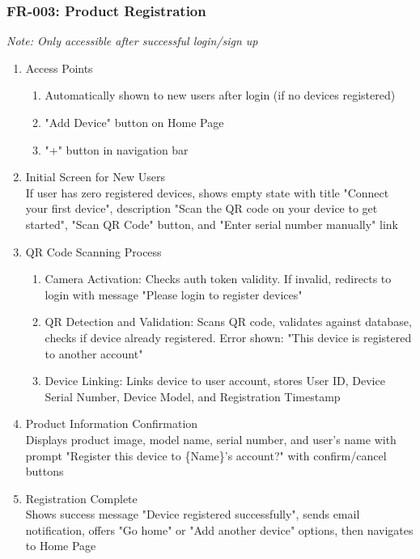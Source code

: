 \documentclass[conference]{IEEEtran}
\begin{document}
        \subsubsection{FR-003: Product Registration}
            \textit{Note: Only accessible after successful login/sign up}
            \begin{enumerate}
                \item Access Points
                    \begin{enumerate}
                        \item Automatically shown to new users after login (if no devices registered)
                        \item "Add Device" button on Home Page
                        \item "+" button in navigation bar
                    \end{enumerate}
                \item Initial Screen for New Users\\
                If user has zero registered devices, shows empty state with title "Connect your first device", description "Scan the QR code on your device to get started", "Scan QR Code" button, and "Enter serial number manually" link
                \item QR Code Scanning Process
                    \begin{enumerate}
                        \item Camera Activation: Checks auth token validity. If invalid, redirects to login with message "Please login to register devices"
                        \item QR Detection and Validation: Scans QR code, validates against database, checks if device already registered. Error shown: "This device is registered to another account"
                        \item Device Linking: Links device to user account, stores User ID, Device Serial Number, Device Model, and Registration Timestamp
                    \end{enumerate}
                \item Product Information Confirmation\\
                    Displays product image, model name, serial number, and user's name with prompt "Register this device to \{Name\}'s account?" with confirm/cancel buttons
                \item Registration Complete\\
                    Shows success message "Device registered successfully", sends email notification, offers "Go home" or "Add another device" options, then navigates to Home Page
            \end{enumerate}
\end{document}
